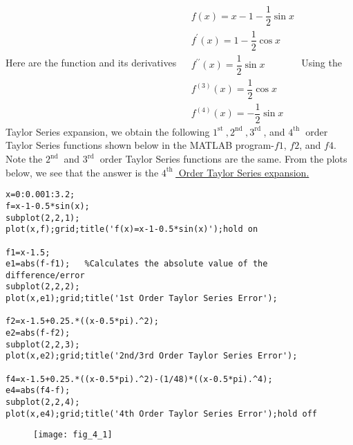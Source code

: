 \documentclass[../main.tex]{subfiles}
\begin{document}
\begin{enumerate}[label=\bfseries(\alph*)]
\section{}
Here are the function and its derivatives
\bigbreak$
\begin{aligned}
&f(x)=x-1-\dfrac{1}{2} \sin x \\
&f^{\prime}(x)=1-\dfrac{1}{2} \cos x \\
&f^{\prime \prime}(x)=\dfrac{1}{2} \sin x \\
&f^{(3)}(x)=\dfrac{1}{2} \cos x \\
&f^{(4)}(x)=-\dfrac{1}{2} \sin x
\end{aligned}$
\bigbreak
Using the Taylor Series expansion, we obtain the following $1^{\text {st }}, 2^{\text {nd }}, 3^{\text {rd }}$, and $4^{\text {th }}$ order Taylor Series functions shown below in the MATLAB program-$f1$, $f2$, and $f 4$. Note the $2^{\text {nd }}$ and $3^{\text {rd }}$ order Taylor Series functions are the same.
\bigbreak
From the plots below, we see that the answer is the \underline{$4^{\text {th }}$ Order Taylor Series expansion.}
\bigbreak
\begin{lstlisting}[numbers=none]
x=0:0.001:3.2;
f=x-1-0.5*sin(x);
subplot(2,2,1);
plot(x,f);grid;title('f(x)=x-1-0.5*sin(x)');hold on

f1=x-1.5;
e1=abs(f-f1);   %Calculates the absolute value of the
difference/error
subplot(2,2,2);
plot(x,e1);grid;title('1st Order Taylor Series Error');

f2=x-1.5+0.25.*((x-0.5*pi).^2);
e2=abs(f-f2);
subplot(2,2,3);
plot(x,e2);grid;title('2nd/3rd Order Taylor Series Error');

f4=x-1.5+0.25.*((x-0.5*pi).^2)-(1/48)*((x-0.5*pi).^4);
e4=abs(f4-f);
subplot(2,2,4);
plot(x,e4);grid;title('4th Order Taylor Series Error');hold off
\end{lstlisting}
\bigbreak
\begin{figure}[H]\quad\quad\quad\quad\quad\quad\quad\quad
		\texttt{[image: fig\_4\_1]}
		\label{fig:fig_4_1}
	\end{figure}
	\bigbreak

\end{enumerate}
\end{document}
